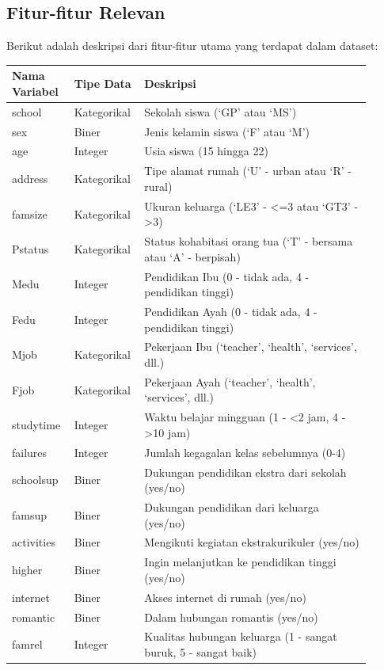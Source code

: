 \subsection{Fitur-fitur Relevan}
Berikut adalah deskripsi dari fitur-fitur utama yang terdapat dalam dataset:
\begin{longtable}{|p{0.15\linewidth}|p{0.15\linewidth}|p{0.6\linewidth}|}
    \hline
    \textbf{Nama Variabel} & \textbf{Tipe Data} & \textbf{Deskripsi} \\
    \hline
    \endhead
    school & Kategorikal & Sekolah siswa (`GP' atau `MS') \\
    sex & Biner & Jenis kelamin siswa (`F' atau `M') \\
    age & Integer & Usia siswa (15 hingga 22) \\
    address & Kategorikal & Tipe alamat rumah (`U' - urban atau `R' - rural) \\
    famsize & Kategorikal & Ukuran keluarga (`LE3' - <=3 atau `GT3' - >3) \\
    Pstatus & Kategorikal & Status kohabitasi orang tua (`T' - bersama atau `A' - berpisah) \\
    Medu & Integer & Pendidikan Ibu (0 - tidak ada, 4 - pendidikan tinggi) \\
    Fedu & Integer & Pendidikan Ayah (0 - tidak ada, 4 - pendidikan tinggi) \\
    Mjob & Kategorikal & Pekerjaan Ibu (`teacher', `health', `services', dll.) \\
    Fjob & Kategorikal & Pekerjaan Ayah (`teacher', `health', `services', dll.) \\
    studytime & Integer & Waktu belajar mingguan (1 - <2 jam, 4 - >10 jam) \\
    failures & Integer & Jumlah kegagalan kelas sebelumnya (0-4) \\
    schoolsup & Biner & Dukungan pendidikan ekstra dari sekolah (yes/no) \\
    famsup & Biner & Dukungan pendidikan dari keluarga (yes/no) \\
    activities & Biner & Mengikuti kegiatan ekstrakurikuler (yes/no) \\
    higher & Biner & Ingin melanjutkan ke pendidikan tinggi (yes/no) \\
    internet & Biner & Akses internet di rumah (yes/no) \\
    romantic & Biner & Dalam hubungan romantis (yes/no) \\
    famrel & Integer & Kualitas hubungan keluarga (1 - sangat buruk, 5 - sangat baik) \\

\end{longtable}
